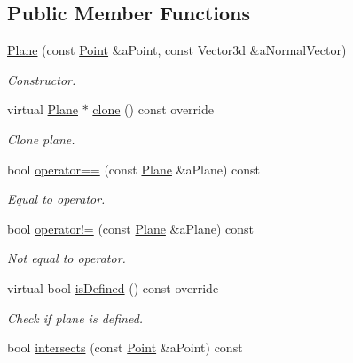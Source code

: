 \subsection*{Public Member Functions}
\begin{DoxyCompactItemize}
\item 
\hyperlink{classlibrary_1_1math_1_1geom_1_1d3_1_1objects_1_1_plane_a81fe78a983e2cb6ee6ad9bfabd22c3a4}{Plane} (const \hyperlink{classlibrary_1_1math_1_1geom_1_1d3_1_1objects_1_1_point}{Point} \&a\+Point, const Vector3d \&a\+Normal\+Vector)
\begin{DoxyCompactList}\small\item\em Constructor. \end{DoxyCompactList}\item 
virtual \hyperlink{classlibrary_1_1math_1_1geom_1_1d3_1_1objects_1_1_plane}{Plane} $\ast$ \hyperlink{classlibrary_1_1math_1_1geom_1_1d3_1_1objects_1_1_plane_a0b6a4ae7bef06f3995f8fd9d32a88870}{clone} () const override
\begin{DoxyCompactList}\small\item\em Clone plane. \end{DoxyCompactList}\item 
bool \hyperlink{classlibrary_1_1math_1_1geom_1_1d3_1_1objects_1_1_plane_a9391589825cac1db971b39452b38f8ea}{operator==} (const \hyperlink{classlibrary_1_1math_1_1geom_1_1d3_1_1objects_1_1_plane}{Plane} \&a\+Plane) const
\begin{DoxyCompactList}\small\item\em Equal to operator. \end{DoxyCompactList}\item 
bool \hyperlink{classlibrary_1_1math_1_1geom_1_1d3_1_1objects_1_1_plane_a5dfafb90b0da2cc239092ea6c655ec2a}{operator!=} (const \hyperlink{classlibrary_1_1math_1_1geom_1_1d3_1_1objects_1_1_plane}{Plane} \&a\+Plane) const
\begin{DoxyCompactList}\small\item\em Not equal to operator. \end{DoxyCompactList}\item 
virtual bool \hyperlink{classlibrary_1_1math_1_1geom_1_1d3_1_1objects_1_1_plane_aafbc8274c270be143b2fa3dc46459f17}{is\+Defined} () const override
\begin{DoxyCompactList}\small\item\em Check if plane is defined. \end{DoxyCompactList}\item 
bool \hyperlink{classlibrary_1_1math_1_1geom_1_1d3_1_1objects_1_1_plane_a9b7ef78b47d1ba47dc87263ba143b0b5}{intersects} (const \hyperlink{classlibrary_1_1math_1_1geom_1_1d3_1_1objects_1_1_point}{Point} \&a\+Point) const

\end{DoxyCompactItemize}
